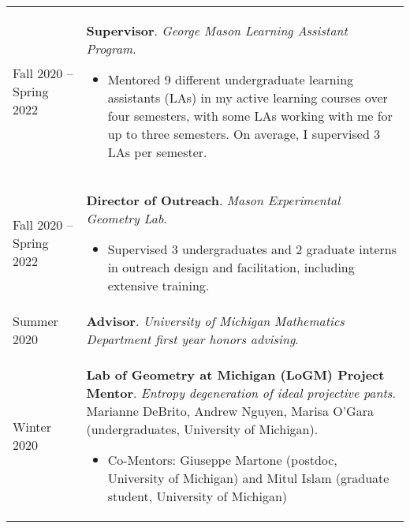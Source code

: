
    \medskip


    \medskip
    
    \begin{center}
    {
    \renewcommand{\arraystretch}{1.5}
    \begin{longtable}{p{}  p{}}
      Fall 2020 --   Spring 2022 & \textbf{Supervisor}. \textit{George Mason Learning Assistant Program}. 
        \hspace{-1em}

        {\small
        \begin{itemize}
        \setlength{\parindent}{0em}
        \item[] Mentored 9 different undergraduate learning assistants (LAs) in my active learning courses over four semesters, with some LAs working with me for up to three semesters. On average, I supervised 3 LAs per semester.
        \end{itemize}
        }
        \vspace{-1em}
         \\ 
  Fall 2020 --   Spring 2022 & \textbf{Director of Outreach}. \textit{Mason Experimental Geometry Lab}. 
        \hspace{-1em}

        {\small
        \begin{itemize}
        \setlength{\parindent}{0em}
        \item[] Supervised 3 undergraduates and 2 graduate interns in outreach design and facilitation, including extensive training.
        \end{itemize}
        }
        \vspace{-1em}
         \\ 
  Summer 2020 & \textbf{Advisor}. \textit{University of Michigan Mathematics Department first year honors advising}.  \\ 
  Winter 2020 & \textbf{Lab of Geometry at Michigan (LoGM) Project Mentor}. \textit{Entropy degeneration of ideal projective pants}.  Marianne DeBrito, Andrew Nguyen, Marisa O'Gara (undergraduates, University of Michigan). 
        \hspace{-1em}

        {\small
        \begin{itemize}
        \setlength{\parindent}{0em}
        \item[] 
            Co-Mentors: Giuseppe Martone (postdoc, University of Michigan) and Mitul Islam (graduate student, University of Michigan)


\end{itemize}}
\end{longtable}}
\end{center}
